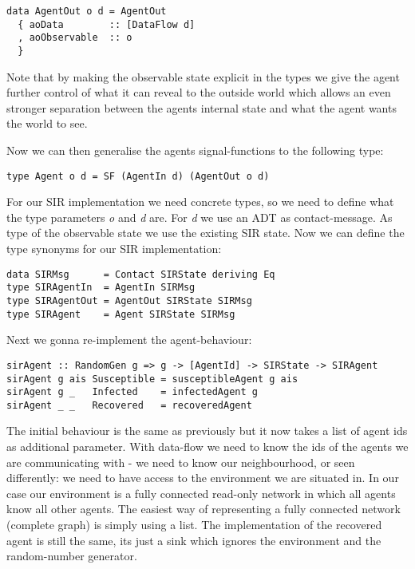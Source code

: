 \begin{verbatim}
data AgentOut o d = AgentOut
  { aoData        :: [DataFlow d]
  , aoObservable  :: o
  }
\end{verbatim}

Note that by making the observable state explicit in the types we give the agent further control of what it can reveal to the outside world which allows an even stronger separation between the agents internal state and what the agent wants the world to see.

Now we can then generalise the agents signal-functions to the following type:
\begin{verbatim}
type Agent o d = SF (AgentIn d) (AgentOut o d)
\end{verbatim}

For our SIR implementation we need concrete types, so we need to define what the type parameters \textit{o} and \textit{d} are. For \textit{d} we use an ADT as contact-message. As type of the observable state we use the existing SIR state. Now we can define the type synonyms for our SIR implementation:
\begin{verbatim}
data SIRMsg      = Contact SIRState deriving Eq
type SIRAgentIn  = AgentIn SIRMsg
type SIRAgentOut = AgentOut SIRState SIRMsg
type SIRAgent    = Agent SIRState SIRMsg
\end{verbatim}

Next we gonna re-implement the agent-behaviour:

\begin{verbatim}
sirAgent :: RandomGen g => g -> [AgentId] -> SIRState -> SIRAgent
sirAgent g ais Susceptible = susceptibleAgent g ais
sirAgent g _   Infected    = infectedAgent g
sirAgent _ _   Recovered   = recoveredAgent
\end{verbatim}

The initial behaviour is the same as previously but it now takes a list of agent ids as additional parameter. With data-flow we need to know the ids of the agents we are communicating with - we need to know our neighbourhood, or seen differently: we need to have access to the environment we are situated in. In our case our environment is a fully connected read-only network in which all agents know all other agents. The easiest way of representing a fully connected network (complete graph) is simply using a list. 
The implementation of the recovered agent is still the same, its just a sink which ignores the environment and the random-number generator. 

